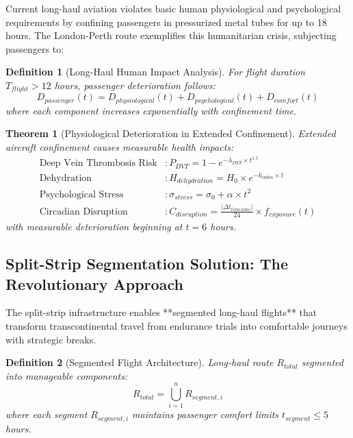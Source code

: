 \documentclass[12pt,a4paper]{article}
\newtheorem{theorem}{Theorem}
\newtheorem{definition}{Definition}
\begin{document}
Current long-haul aviation violates basic human physiological and psychological requirements by confining passengers in pressurized metal tubes for up to 18 hours. The London-Perth route exemplifies this humanitarian crisis, subjecting passengers to:

\begin{definition}[Long-Haul Human Impact Analysis]
For flight duration $T_{flight} > 12$ hours, passenger deterioration follows:
\begin{equation}
D_{passenger}(t) = D_{physiological}(t) + D_{psychological}(t) + D_{comfort}(t)
\end{equation}
where each component increases exponentially with confinement time.
\end{definition}

\begin{theorem}[Physiological Deterioration in Extended Confinement]
Extended aircraft confinement causes measurable health impacts:
\begin{align}
\text{Deep Vein Thrombosis Risk} &: P_{DVT} = 1 - e^{-\lambda_{DVT} \times t^{1.5}} \\
\text{Dehydration} &: H_{dehydration} = H_0 \times e^{-k_{cabin} \times t} \\
\text{Psychological Stress} &: \sigma_{stress} = \sigma_0 + \alpha \times t^2 \\
\text{Circadian Disruption} &: C_{disruption} = \frac{|\Delta t_{timezone}|}{24} \times f_{exposure}(t)
\end{align}
with measurable deterioration beginning at $t = 6$ hours.
\end{theorem}

\subsection{Split-Strip Segmentation Solution: The Revolutionary Approach}

The split-strip infrastructure enables **segmented long-haul flights** that transform transcontinental travel from endurance trials into comfortable journeys with strategic breaks.

\begin{definition}[Segmented Flight Architecture]
Long-haul route $R_{total}$ segmented into manageable components:
\begin{equation}
R_{total} = \bigcup_{i=1}^{n} R_{segment,i}
\end{equation}
where each segment $R_{segment,i}$ maintains passenger comfort limits $t_{segment} \leq 5$ hours.
\end{definition}
\end{document}

